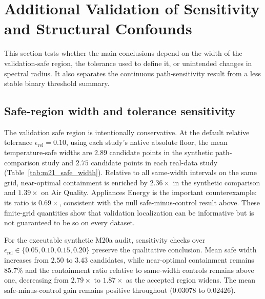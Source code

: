 \documentclass[preprint,12pt,authoryear]{elsarticle}
\begin{document}
\section{Additional Validation of Sensitivity and Structural Confounds}
\label{sec:additional_validation}

This section tests whether the main conclusions depend on the width of the validation-safe region, the tolerance used to define it, or unintended changes in spectral radius. It also separates the continuous path-sensitivity result from a less stable binary threshold summary.

\subsection{Safe-region width and tolerance sensitivity}

The validation safe region is intentionally conservative. At the default relative tolerance $\epsilon_{\mathrm{rel}}=0.10$, using each study's native absolute floor, the mean temperature-safe widths are $2.89$ candidate points in the synthetic path-comparison study and $2.75$ candidate points in each real-data study (Table~\ref{tab:m21_safe_width}). Relative to all same-width intervals on the same grid, near-optimal containment is enriched by $2.36\times$ in the synthetic comparison and $1.39\times$ on Air Quality. Appliances Energy is the important counterexample: its ratio is $0.69\times$, consistent with the null safe-minus-control result above. These finite-grid quantities show that validation localization can be informative but is not guaranteed to be so on every dataset.

For the executable synthetic M20a audit, sensitivity checks over $\epsilon_{\mathrm{rel}}\in\{0.05,0.10,0.15,0.20\}$ preserve the qualitative conclusion. Mean safe width increases from $2.50$ to $3.43$ candidates, while near-optimal containment remains $85.7\%$ and the containment ratio relative to same-width controls remains above one, decreasing from $2.79\times$ to $1.87\times$ as the accepted region widens. The mean safe-minus-control gain remains positive throughout ($0.03078$ to $0.02426$).
\end{document}
